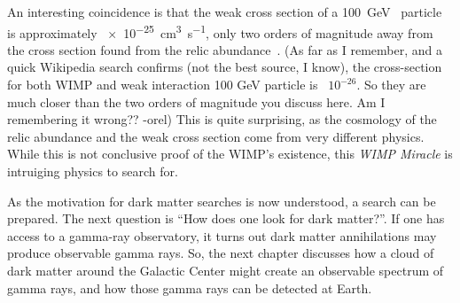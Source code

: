 An interesting coincidence is that the weak cross section of a \SI{100}{\GeV{}} particle is approximately \SI{e-25}{cm^3s^{-1}}, only two orders of magnitude away from the cross section found from the relic abundance~\cite{Jungman:1995df}.
{\color{red}(As far as I remember, and a quick Wikipedia search confirms (not the best source, I know), the cross-section for both WIMP and weak interaction 100 GeV particle is ~$10^{-26}$. So they are much closer than the two orders of magnitude you discuss here. Am I remembering it wrong?? -orel)}
This is quite surprising, as the cosmology of the relic abundance and the weak cross section come from very different physics.
While this is not conclusive proof of the WIMP's existence, this \textit{WIMP Miracle} is intruiging physics to search for.


As the motivation for dark matter searches is now understood, a search can be prepared.
The next question is ``How does one look for dark matter?''.
If one has access to a gamma-ray observatory, it turns out dark matter annihilations may produce observable gamma rays.
So, the next chapter discusses how a cloud of dark matter around the Galactic Center might create an observable spectrum of gamma rays, and how those gamma rays can be detected at Earth.

















